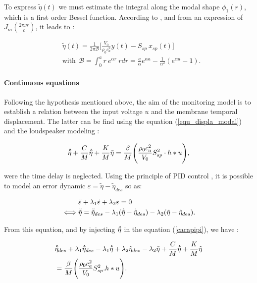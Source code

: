 \documentclass[11pt, twocolumn]{article}
\begin{document}
To express $\tilde{\eta}(t)$ we must estimate the integral along the modal shape $\phi_1(r)$, which is a first order Bessel function. According to \cite{morse1995vibration}, and from an expression of $J_m(\frac{2 \pi \nu r}{c})$, 
it leads to :

\begin{align}
        &\tilde{\eta}(t) =  \frac{1}{ 2 \pi \mathcal{B}} \Bigg[ \frac{V_0}{\rho_0 c_a^2 } y(t)  - S_{sp} \: x_{sp}(t)  \Bigg] \qquad \\ &\text{with}~~\mathcal{B} = \int_0^a r \: e^{\alpha r} \: r dr = \frac{a}{\alpha} e^{\alpha a} - \frac{1}{\alpha^2} (e^{\alpha a} - 1 ).
\end{align}

\paragraph{Continuous equations} Following the hypothesis mentioned above, the aim of the monitoring model is to establish a relation between the input voltage $u$ and the membrane temporal displacement. The latter can be find using the equation (\ref{equ_displa_modal}) and the loudspeaker modeling : 

\begin{equation}
    \Ddot{\Tilde{\eta}} + \frac{C}{M} \Dot{\Tilde{\eta}} + \frac{K}{M} \Tilde{\eta} = \frac{\beta}{M} \Bigg(\frac{\rho_0c_a^2}{V_0} S_{sp}^2 \cdot h * u \Bigg),
    \label{cacapipi}
\end{equation}

were the time delay is neglected. Using the principle of PID control \cite{PID}, it is possible to model an error dynamic $\varepsilon = \tilde{\eta} - \tilde{\eta}_{des}$ so as: 

\begin{align}
    &\Ddot{\varepsilon} + \lambda_1 \Dot{\varepsilon} + \lambda_2 \varepsilon = 0 \nonumber\\
    \iff &\Ddot{\tilde{\eta}} = \Ddot{\tilde{\eta}}_{des} - \lambda_1 (\dot{\tilde{\eta}} - \dot{\tilde{\eta}}_{des}) - \lambda_2 (\tilde{\eta} - \tilde{\eta}_{des}).
\end{align}

From this equation, and by injecting $\Ddot{\tilde{\eta}}$ in the equation (\ref{cacapipi}), we have :

\begin{align}
    &\Ddot{\tilde{\eta}}_{des} + \lambda_1 \dot{\tilde{\eta}}_{des} - \lambda_1 \dot{\tilde{\eta}} + \lambda_2 \tilde{\eta}_{des} - \lambda_2 \tilde{\eta} + \frac{C}{M} \dot{\tilde{\eta}} + \frac{K}{M} \tilde{\eta} \nonumber \\
    &= \frac{\beta}{M} \Bigg(\frac{\rho_0c_a^2}{V_0} S_{sp}^2 . h * u \Bigg).
\end{align}
\end{document}
